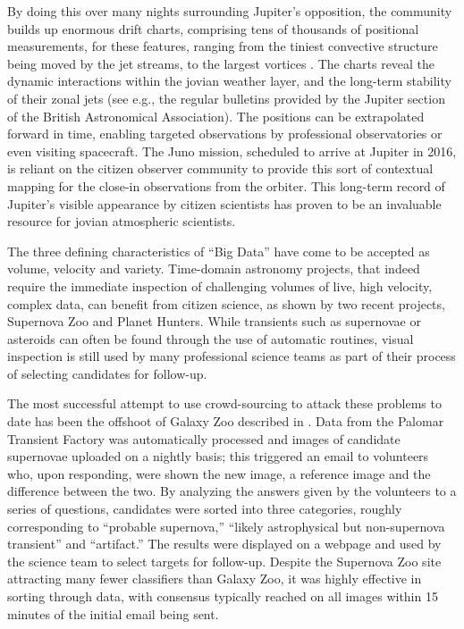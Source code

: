 \documentclass{ar2e}
\begin{document}
By doing this over many nights surrounding Jupiter's opposition, the community
builds up enormous drift charts, comprising tens of thousands of positional
measurements, for these features, ranging from the tiniest convective structure
being moved by the jet streams, to the largest vortices
\citep[e.g.][]{WinJUPOSRedSpot}.  The charts reveal the dynamic interactions
within the jovian weather layer, and the long-term stability of their zonal jets
(see e.g., the regular bulletins provided by the Jupiter section of the British
Astronomical Association). The positions can be extrapolated forward in time,
enabling targeted observations by professional observatories or even visiting
spacecraft. The Juno mission, scheduled to arrive at Jupiter in 2016, is reliant
on the citizen observer community to provide this sort of contextual mapping for
the close-in observations from the orbiter.  This long-term record of Jupiter's
visible appearance by citizen scientists has proven to be an  invaluable
resource for jovian atmospheric scientists.



\label{SNZoo} 
The three defining characteristics of ``Big Data'' have come to be accepted as
volume, velocity and variety.  Time-domain astronomy projects, that indeed
require the immediate inspection of challenging volumes of live, high velocity,
complex data, can benefit from citizen science, as shown by two recent projects,
Supernova Zoo and Planet Hunters.   While transients such as supernovae or
asteroids can often be found through the use of automatic routines, visual
inspection is still used by many professional science teams as part of their
process of selecting candidates for follow-up. 

The most successful attempt to use crowd-sourcing to attack these problems to
date has been the offshoot of Galaxy Zoo described in \citet{SmithSN}.  Data
from the Palomar Transient Factory \citep{LawPTF} was automatically processed
and images of candidate supernovae uploaded on a nightly basis; this triggered
an email to volunteers who, upon responding, were shown the new image, a
reference image and the difference between the two. By analyzing the answers
given by the volunteers to a series of questions, candidates were sorted into 
three categories, roughly corresponding to ``probable supernova,'' ``likely
astrophysical but non-supernova transient'' and ``artifact.'' The results were
displayed on a webpage and used by the science team to select targets for
follow-up. Despite the Supernova Zoo site attracting many fewer classifiers 
than Galaxy Zoo, it was highly effective in sorting through data,  with
consensus typically reached on all images within 15 minutes of the initial email
being sent. 
\end{document}
